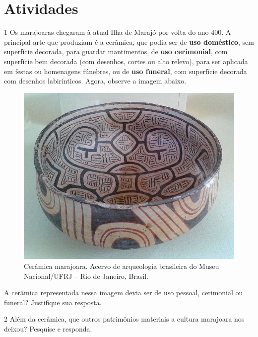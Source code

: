 \pagebreak
\section{Atividades}

\num{1} Os marajoaras chegaram à atual Ilha de Marajó por volta do ano 400. A principal arte que produziam é a cerâmica, que podia ser de \textbf{uso doméstico}, sem superfície decorada, para guardar mantimentos, de \textbf{uso cerimonial}, com superfície bem decorada (com desenhos, cortes ou alto relevo), para ser aplicada em festas ou homenagens fúnebres, ou de \textbf{uso funeral}, com superfície decorada com desenhos labirínticos. Agora, observe a imagem abaixo.

\begin{figure}[htpb!]
\includegraphics[width=\textwidth]{./imgs/art24.jpg}
\caption{Cerâmica marajoara. Acervo de arqueologia brasileira do Museu Nacional/UFRJ – Rio de Janeiro, Brasil.}
\end{figure}

\noindent{}A cerâmica representada nessa imagem devia ser de uso pessoal, cerimonial ou funeral? Justifique sua resposta.



\num{2}  Além da cerâmica, que outros patrimônios materiais a cultura marajoara nos deixou? Pesquise e responda.



